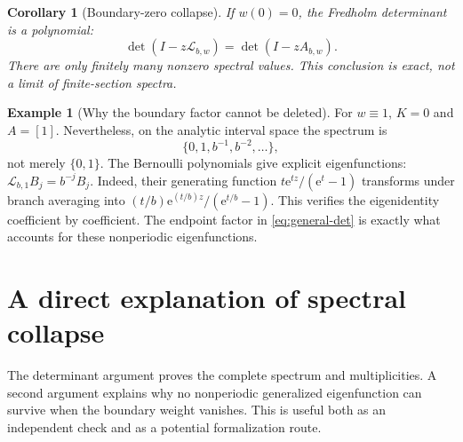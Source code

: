 \documentclass[11pt,a4paper]{article}
\newtheorem{corollary}[theorem]{Corollary}
\theoremstyle{definition}
\newtheorem{example}[theorem]{Example}
\theoremstyle{remark}
\newcommand{\e}{\mathrm e}
\newcommand{\Lop}{\mathcal L}
\numberwithin{equation}{section}
\begin{document}
\begin{corollary}[Boundary-zero collapse]
\label{cor:collapse}
If $w(0)=0$, the Fredholm determinant is a polynomial:
\begin{equation}
 \det(I-z\Lop_{b,w})=\det(I-zA_{b,w}).
 \label{eq:collapse}
\end{equation}
There are only finitely many nonzero spectral values. This conclusion is
exact, not a limit of finite-section spectra.
\end{corollary}

\begin{example}[Why the boundary factor cannot be deleted]
\label{ex:constant}
For $w\equiv1$, $K=0$ and $A=[1]$. Nevertheless, on the analytic interval
space the spectrum is
\[
 \{0,1,b^{-1},b^{-2},\ldots\},
\]
not merely $\{0,1\}$. The Bernoulli polynomials give explicit eigenfunctions:
$\Lop_{b,1}B_j=b^{-j}B_j$. Indeed, their generating function
$t\e^{tz}/(\e^t-1)$ transforms under branch averaging into
$(t/b)\e^{(t/b)z}/(\e^{t/b}-1)$. This verifies the eigenidentity coefficient
by coefficient. The endpoint factor in \cref{eq:general-det} is exactly what
accounts for these nonperiodic eigenfunctions.
\end{example}

\section{A direct explanation of spectral collapse}
\label{sec:direct}
The determinant argument proves the complete spectrum and multiplicities.
A second argument explains why no nonperiodic generalized eigenfunction can
survive when the boundary weight vanishes. This is useful both as an
independent check and as a potential formalization route.
\end{document}
